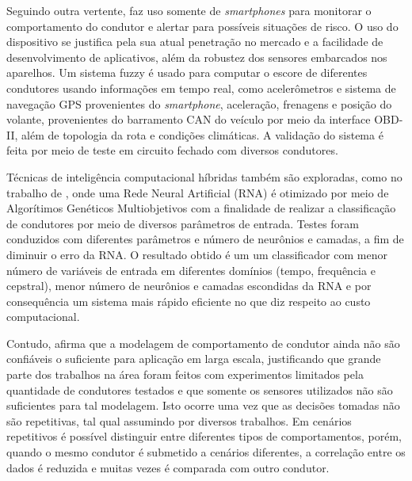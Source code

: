 Seguindo outra vertente,  faz uso somente de \textit{smartphones} para monitorar o comportamento do condutor e alertar para possíveis situações de risco. O uso do dispositivo se justifica pela sua atual penetração no mercado e a facilidade de desenvolvimento de aplicativos, além da robustez dos sensores embarcados nos aparelhos. Um sistema fuzzy é usado para computar o escore de diferentes condutores usando informações em tempo real, como acelerômetros e sistema de navegação GPS provenientes do \textit{smartphone}, aceleração, frenagens e posição do volante, provenientes do barramento CAN do veículo por meio da interface OBD-II, além de topologia da rota e condições climáticas. A validação do sistema é feita por meio de teste em circuito fechado com diversos condutores.

Técnicas de inteligência computacional híbridas também são exploradas, como no trabalho de , onde uma Rede Neural Artificial (RNA) é otimizado por meio de Algorítimos Genéticos Multiobjetivos com a finalidade de realizar a classificação de condutores por meio de diversos parâmetros de entrada. Testes foram conduzidos com diferentes parâmetros e número de neurônios e camadas, a fim de diminuir o erro da RNA. O resultado obtido é um um classificador com menor número de variáveis de entrada em diferentes domínios (tempo, frequência e cepstral), menor número de neurônios e camadas escondidas da RNA e por consequência um sistema mais rápido eficiente no que diz respeito ao custo computacional.

Contudo,  afirma que a modelagem de comportamento de condutor ainda não são confiáveis o suficiente para aplicação em larga escala, justificando que grande parte dos trabalhos na área foram feitos com experimentos limitados pela quantidade de condutores testados e que somente os sensores utilizados não são suficientes para tal modelagem. Isto ocorre uma vez que as decisões tomadas não são repetitivas, tal qual assumindo por diversos trabalhos. Em cenários repetitivos é possível distinguir entre diferentes tipos de comportamentos, porém, quando o mesmo condutor é submetido a cenários diferentes, a correlação entre os dados é reduzida e muitas vezes é comparada com outro condutor. 


